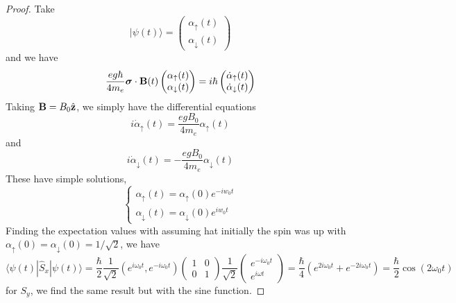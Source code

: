 \vspace{2ex}
\begin{proof}
Take 
\[|\psi (t)\rangle =\begin{pmatrix}
\alpha _{\uparrow}(t)\\
\alpha _{\downarrow}(t)
\end{pmatrix}
\]
and we have
\[\dfrac{eg\hbar }{4m_{e}}{\bm \sigma }\cdot {\bf B}(t)\begin{pmatrix}
\alpha _{\uparrow}(t)\\
\alpha_{\downarrow}(t)
\end{pmatrix}=i\hbar \begin{pmatrix}
\dot{\alpha} _{\uparrow}(t)\\
\dot{\alpha}_{\downarrow}(t)
\end{pmatrix}
\]
Taking ${\bf B}=B_{0}\hat{{\bf z}}$, we simply have the differential equations
\[i\dot{\alpha }_{\uparrow}(t)=\dfrac{egB_0}{4m_{e}}\alpha _{\uparrow}(t)\]
and
\[i\dot{\alpha }_{\downarrow}(t)=-\dfrac{egB_{0}}{4m_{e}}\alpha _{\downarrow}(t)\]
These have simple solutions,
\[\begin{cases}
\alpha _{\uparrow}(t)=\alpha _{\uparrow}(0)e^{-iw_{0}t}\\
\alpha _{\downarrow}(t)=\alpha _{\downarrow}(0)e^{iw_0t}
\end{cases}\]
Finding the expectation values with assuming hat initially the spin was up with $\alpha _{\uparrow}(0)=\alpha _{\downarrow}(0)=1/\sqrt{2}$, we have
\[\langle \psi (t)|\hat{S}_{x}|\psi (t)\rangle =\dfrac{\hbar }{2}\dfrac{1}{\sqrt{2}}(e^{i\omega _0t},e^{-i\omega _0t})\begin{pmatrix}
1&0\\0&1
\end{pmatrix}\dfrac{1}{\sqrt{2}}\begin{pmatrix}
e^{-i\omega_0t}\\e^{i\omega t}
\end{pmatrix}
=\dfrac{\hbar }{4}(e^{2i\omega_0t}+e^{-2i\omega_0t})=\dfrac{\hbar }{2}\cos (2\omega_0t)
\]
for $S_{y}$, we find the same result but with the sine function.
\end{proof}
\vspace{2ex}

